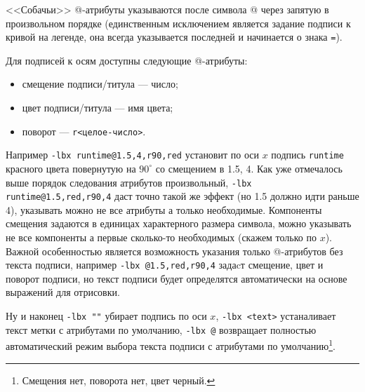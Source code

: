 \documentclass[12pt]{article}
\begin{document}
<<Собачьи>> @-атрибуты указываются после символа @ через запятую в произвольном порядке (единственным исключением является задание подписи к кривой на легенде,
она всегда указывается последней и начинается о знака \verb'='). 

Для подписей к осям доступны следующие @-атрибуты:
\begin{itemize}
\item смещение подписи/титула --- число;
\item цвет подписи/титула --- имя цвета;
\item поворот --- \verb'r<целое-число>'.
\end{itemize}
Например \verb'-lbx runtime@1.5,4,r90,red' установит по оси $x$ подпись \verb'runtime' красного цвета повернутую на $90^\circ$ со смещением в 1.5, 4.
Как уже отмечалось выше порядок следования атрибутов произвольный, \verb'-lbx runtime@1.5,red,r90,4' даст точно такой же эффект (но 1.5 должно идти раньше 4),
указывать можно не все атрибуты а только необходимые. 
Компоненты смещения задаются в единицах характерного размера символа, можно указывать не все компоненты а первые сколько-то необходимых (скажем только по $x$).
Важной особенностью является возможность указания только @-атрибутов без текста подписи, например \verb'-lbx @1.5,red,r90,4' задаcт смещение, цвет и поворот
подписи, но текст подписи будет определятся автоматически на основе выражений для отрисовки.

Ну и наконец \verb'-lbx ""' убирает подпись по оси $x$, \verb'-lbx <text>' устаналивает текст метки с атрибутами по умолчанию, 
\verb'-lbx @' возвращает полностью автоматический режим выбора текста подписи с атрибутами по умолчанию\footnote{Смещения нет, поворота нет, цвет черный.}.
\end{document}
